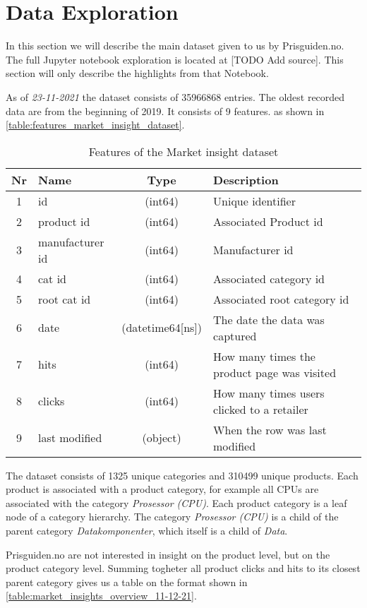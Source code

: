 \section{Data Exploration}
\label{section:Architecture:DataExploration}
In this section we will describe the main dataset given to us 
by Prisguiden.no. The full Jupyter notebook exploration
is located at [TODO Add source]. This section will only
describe the highlights from that Notebook.

As of \textit{23-11-2021} the dataset consists of 35966868 entries.
The oldest recorded data are from the beginning of 2019.
It consists of 9 features.
as shown in \autoref{table:features_market_insight_dataset}.
\begin{table}[htbp]
  \centering
  \caption{Features of the Market insight dataset}
  \label{table:features_market_insight_dataset}
  \begin{tabular}{|c|l|c|l|}\hline\hline
   Nr & Name & Type & Description \\ \hline 
   1 &id &(int64) & Unique identifier \\ \hline
  2 & product id & (int64) & Associated Product id \\ \hline
  3 & manufacturer id & (int64) & Manufacturer id \\ \hline
  4 &cat id & (int64) & Associated category id \\ \hline
  5 & root cat id & (int64) & Associated root category id \\ \hline
  6 & date & (datetime64[ns]) & The date the data was captured \\ \hline
  7 & hits & (int64) & How many times the product page was visited \\ \hline
  8 &clicks & (int64) & How many times users clicked to a retailer \\ \hline
  9 & last modified & (object) & When the row was last modified \\ \hline
  \end{tabular}
\end{table}

The dataset consists of 1325 unique categories and 310499 unique products.
Each product is associated with a product category, for example
all CPUs are associated with the category
\textit{Prosessor (CPU)}.
Each product category is a leaf node of a category hierarchy.
The category \textit{Prosessor (CPU)} is a child of the parent category 
\textit{Datakomponenter}, which itself is a child of \textit{Data}.

Prisguiden.no are not interested in insight on the product level, but on the product category level.
Summing togheter all product clicks and hits to its closest parent category
gives us a table on the format shown in \autoref{table:market_insights_overview_11-12-21}.


